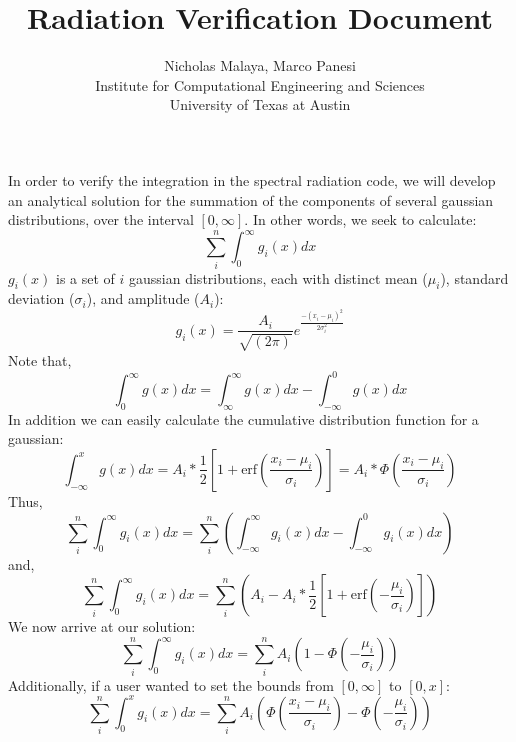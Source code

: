 \documentclass{article}
\title{\bf{Radiation Verification Document}}
\author{Nicholas Malaya, Marco Panesi \\ Institute for Computational
Engineering and Sciences \\ University of Texas at Austin} \date{}
\begin{document}
\maketitle

In order to verify the integration in the spectral radiation code, we will develop an analytical solution for 
the summation of the components of several gaussian distributions, over the interval $[0,\infty]$. 
\newline
\newline
In other words, we seek to calculate:
\begin{equation}
  \sum_i^n \int^\infty_0 g_i(x) dx
\end{equation}
\newline
\newline
$g_i(x)$ is a set of $i$ gaussian distributions, each with distinct mean ($\mu_i$), standard deviation ($\sigma_i$), and amplitude ($A_i$):
\begin{equation}
  g_i(x) = \frac{A_i}{\sqrt{(2 \pi)}}e^{\frac{-(x_i-\mu_i)^2}{2 \sigma_i^2}}
\end{equation}
\newline
\newline
Note that,
\begin{equation}
  \int^\infty_0 g(x) dx = \int^\infty_\infty g(x) dx  -  \int^0_{-\infty} g(x)dx
\end{equation}
In addition we can easily calculate the cumulative distribution function for a gaussian:
\begin{equation}
  \int^x_{-\infty} g(x) dx = A_i * \frac12 [1+\textrm{erf}(\frac{x_i-\mu_i}{\sigma_i})] = A_i * \Phi(\frac{x_i-\mu_i}{\sigma_i})
\end{equation}
Thus, 
\begin{equation}
  \sum_i^n \int^\infty_0 g_i(x) dx = \sum_i^n ( \int^\infty_{-\infty} g_i(x) dx  -  \int^0_{-\infty} g_i(x)dx)
\end{equation}
and,
\begin{equation}
  \sum_i^n \int^\infty_0 g_i(x) dx = \sum_i^n ( A_i  - A_i * \frac12 [1+\textrm{erf}(-\frac{\mu_i}{\sigma_i})])
\end{equation}
We now arrive at our solution:
\begin{equation}
  \sum_i^n \int^\infty_0 g_i(x) dx = \sum_i^n A_i ( 1  -  \Phi(-\frac{\mu_i}{\sigma_i}))
\end{equation}
\newline
\newline
Additionally, if a user wanted to set the bounds from $[0,\infty]$ to $[0,x]$:
\begin{equation}
  \sum_i^n \int^x_0 g_i(x) dx = \sum_i^n A_i ( \Phi(\frac{x_i-\mu_i}{\sigma_i}) - \Phi(-\frac{\mu_i}{\sigma_i}))
\end{equation}
\end{document}
